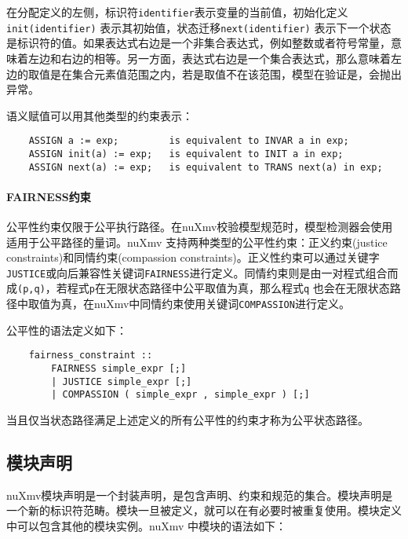 在分配定义的左侧，标识符\verb|identifier|表示变量的当前值，初始化定义\verb|init(identifier)| 表示其初始值，状态迁移\verb|next(identifier)| 表示下一个状态是标识符的值。如果表达式右边是一个非集合表达式，例如整数或者符号常量，意味着左边和右边的相等。另一方面，表达式右边是一个集合表达式，那么意味着左边的取值是在集合元素值范围之内，若是取值不在该范围，模型在验证是，会抛出异常。

语义赋值可以用其他类型的约束表示：
\begin{lstlisting}
    ASSIGN a := exp;         is equivalent to INVAR a in exp;
    ASSIGN init(a) := exp;   is equivalent to INIT a in exp;
    ASSIGN next(a) := exp;   is equivalent to TRANS next(a) in exp;
\end{lstlisting}

\paragraph{FAIRNESS约束}
公平性约束仅限于公平执行路径。在nuXmv校验模型规范时，模型检测器会使用适用于公平路径的量词。nuXmv 支持两种类型的公平性约束：正义约束(justice constraints)和同情约束(compassion constraints)。正义性约束可以通过关键字\verb|JUSTICE|或向后兼容性关键词\verb|FAIRNESS|进行定义。同情约束则是由一对程式组合而成\verb|(p,q)|，若程式\verb|p|在无限状态路径中公平取值为真，那么程式\verb|q| 也会在无限状态路径中取值为真，在nuXmv中同情约束使用关键词\verb|COMPASSION|进行定义。

公平性的语法定义如下：
\begin{lstlisting}
    fairness_constraint ::
        FAIRNESS simple_expr [;]
        | JUSTICE simple_expr [;]
        | COMPASSION ( simple_expr , simple_expr ) [;]
\end{lstlisting}

当且仅当状态路径满足上述定义的所有公平性的约束才称为公平状态路径。


\subsection{模块声明}
nuXmv模块声明是一个封装声明，是包含声明、约束和规范的集合。模块声明是一个新的标识符范畴。模块一旦被定义，就可以在有必要时被重复使用。模块定义中可以包含其他的模块实例。nuXmv 中模块的语法如下：

